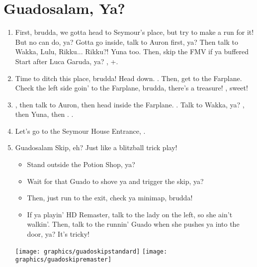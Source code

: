 \chapter{Guadosalam, Ya?}

\begin{enumerate}
\item First, brudda, we gotta head to Seymour's place, but try to make a run for it! But no can do, ya? Gotta go inside, talk to Auron first, ya? Then talk to Wakka, Lulu, Rikku... Rikku?! Yuna too. Then, skip the FMV if ya buffered Start after Luca Garuda, ya? \sd, \skippablefmv+\cs[5:50].
\item Time to ditch this place, brudda! Head down. \sd. Then, get to the Farplane. Check the left side goin' to the Farplane, brudda, there's a treasure! , sweet!
\item \sd, then talk to Auron, then head inside the Farplane. \cs[1:20]. Talk to Wakka, ya? \sd, then Yuna, then \cs[2:10]. \sd.
\item Let's go to the Seymour House Entrance, \sd.
\wincb\losscb\bothcb
\item Guadosalam Skip, eh? Just like a blitzball trick play!
\begin{itemize}
\item Stand outside the Potion Shop, ya?
\item Wait for that Guado to shove ya and trigger the skip, ya?
\item Then, just run to the exit, check ya minimap, brudda!
\item If ya playin' HD Remaster, talk to the lady on the left, so she ain't walkin'. Then, talk to the runnin' Guado when she pushes ya into the door, ya? It's tricky!
\end{itemize}
\texttt{[image: graphics/guadoskipstandard]}
\texttt{[image: graphics/guadoskipremaster]}
\end{enumerate}
